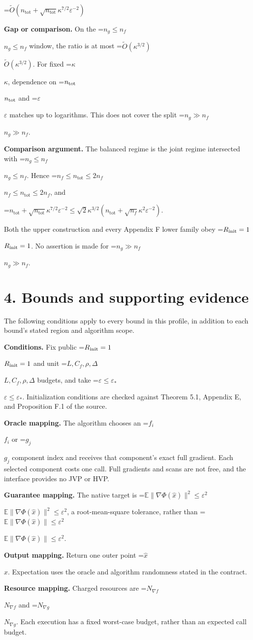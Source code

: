 \documentclass[10pt,a4paper]{article}
\newcommand{\AtlasMath}[1]{\par\begingroup\centering\setbox0=\hbox{$\displaystyle #1$}\ifdim\wd0>1.4\linewidth\typeout{ATLAS WIDE FORMULA: \the\wd0}\fi\ifdim\wd0>\linewidth\resizebox{\linewidth}{!}{\box0}\else\box0\fi\par\endgroup}
\newcommand{\AtlasInlineMath}[1]{\begingroup\setbox0=\hbox{$#1$}\ifdim\wd0>.4\linewidth\endgroup\AtlasMath{#1}\else\endgroup$#1$\fi}
\begin{document}
\AtlasMath{\widetilde O(n_{\mathrm{tot}}+\sqrt{n_{\mathrm{tot}}} \kappa ^{7/2} \varepsilon ^{-2})}
\textbf{Gap or comparison.} On the \AtlasInlineMath{n_g\le n_f} window, the ratio is at most \AtlasInlineMath{\widetilde{O}(\kappa^{3/2})}. For fixed \AtlasInlineMath{\kappa}, dependence on \AtlasInlineMath{n_{\rm tot}} and \AtlasInlineMath{\varepsilon} matches up to logarithms. This does not cover the split \AtlasInlineMath{n_g\gg n_f}.

\textbf{Comparison argument.} The balanced regime is the joint regime intersected with \AtlasInlineMath{n_g\le n_f}. Hence \AtlasInlineMath{n_f\le n_{\mathrm{tot}}\le2n_f}, and 
\AtlasMath{n_{\mathrm{tot}}+\sqrt{n_{\mathrm{tot}}}\kappa^{7/2}\varepsilon^{-2}\le\sqrt2\kappa^{3/2}(n_{\mathrm{tot}}+\sqrt{n_f}\kappa^2\varepsilon^{-2}).}
 Both the upper construction and every Appendix F lower family obey \AtlasInlineMath{R_{\rm init}=1}. No assertion is made for \AtlasInlineMath{n_g\gg n_f}.

\section{4. Bounds and supporting evidence}
The following conditions apply to every bound in this profile, in addition to each bound's stated region and algorithm scope.

\textbf{Conditions.} Fix public \AtlasInlineMath{R_{\rm init}=1} and unit \AtlasInlineMath{L,C_f,\rho,\Delta} budgets, and take \AtlasInlineMath{\varepsilon\le\varepsilon_*}. Initialization conditions are checked against Theorem 5.1, Appendix E, and Proposition F.1 of the source.

\textbf{Oracle mapping.} The algorithm chooses an \AtlasInlineMath{f_i} or \AtlasInlineMath{g_j} component index and receives that component’s exact full gradient. Each selected component costs one call. Full gradients and scans are not free, and the interface provides no JVP or HVP.

\textbf{Guarantee mapping.} The native target is \AtlasInlineMath{\mathbb E\|\nabla\Phi(\widehat x)\|^2\le\varepsilon^2}, a root-mean-square tolerance, rather than \AtlasInlineMath{\mathbb E\|\nabla\Phi(\widehat x)\|\le\varepsilon^2}.

\textbf{Output mapping.} Return one outer point \AtlasInlineMath{\widehat x}. Expectation uses the oracle and algorithm randomness stated in the contract.

\textbf{Resource mapping.} Charged resources are \AtlasInlineMath{N_{\nabla f}} and \AtlasInlineMath{N_{\nabla g}}. Each execution has a fixed worst-case budget, rather than an expected call budget.
\end{document}
